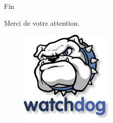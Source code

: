\documentclass{beamer} %
\begin{document}

  \begin{frame}{Fin}
    \begin{center}
      \huge
      Merci de votre attention.

      \begin{figure}
        \includegraphics[width=\linewidth, height=0.6\textheight, keepaspectratio]{logo.png}
      \end{figure}
    \end{center}
  \end{frame}
\end{document}
